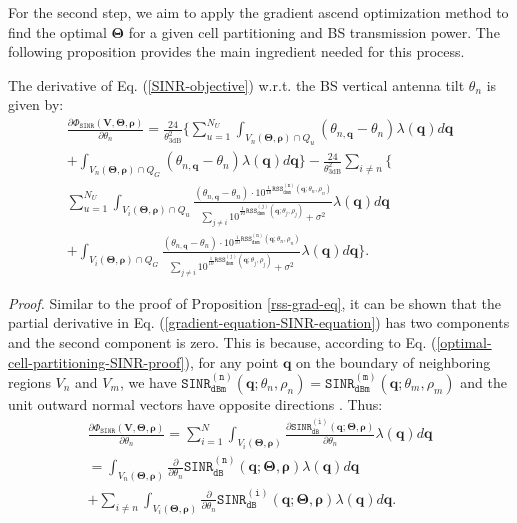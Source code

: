 For the second step, we aim to apply the gradient ascend optimization method to find the optimal $\bm{\Theta}$ for a given cell partitioning and BS transmission power. The following proposition provides the main ingredient needed for this process.
\begin{Proposition}\label{gradient-equation-SINR}
The derivative of Eq. (\ref{SINR-objective}) w.r.t. the BS vertical antenna tilt $\theta_n$ is given by:
\begin{multline}\label{gradient-equation-SINR-equation}
     \frac{\partial \Phi_{\mathtt{SINR}}(\bm{V}, \bm{\Theta}, \bm{\rho})}{\partial \theta_n} =  \frac{24}{\theta^2_{\mathrm{3dB}}} \Bigg\{ \sum_{u=1}^{N_U} \int_{V_n(\mathbf{\Theta}, \bm{\rho})\cap Q_u} \!\!\!\!\!\!\!\!\!\!\!\! (\theta_{n,\bm{q}}-\theta_n) \lambda(\bm{q}) d\bm{q}  
    \\ +  \int_{V_n(\mathbf{\Theta}, \bm{\rho})\cap Q_G} \!\!\!\! (\theta_{n,\bm{q}}-\theta_n) \lambda(\bm{q}) d\bm{q} \Bigg\}  -\frac{24}{\theta^2_{\mathrm{3dB}}} \sum_{i\neq n}^{}  \Bigg\{ \\ \sum_{u=1}^{N_U} \int_{V_i(\mathbf{\Theta}, \bm{\rho})\cap Q_u}  \frac{(\theta_{n,\bm{q}}-\theta_n) \cdot 10^{\frac{1}{10}\mathtt{RSS_{dBm}^{(n)}} (\bm{q}; \theta_n, \rho_n)}}{{\sum_{j\neq i}^{} 10^{\frac{1}{10}\mathtt{RSS_{dBm}^{(j)}} (\bm{q}; \theta_j, \rho_j)} + \sigma^2}} \lambda(\bm{q}) d\bm{q} 
    \\+ \int_{V_i(\mathbf{\Theta}, \bm{\rho})\cap Q_G}  \frac{(\theta_{n,\bm{q}}-\theta_n) \cdot 10^{\frac{1}{10}\mathtt{RSS_{dBm}^{(n)}} (\bm{q}; \theta_n, \rho_n)}}{{\sum_{j\neq i}^{} 10^{\frac{1}{10}\mathtt{RSS_{dBm}^{(j)}} (\bm{q}; \theta_j,\rho_j)} + \sigma^2}} \lambda(\bm{q}) d\bm{q} \Bigg\}.
\end{multline}
\end{Proposition}
\textit{Proof. }Similar to the proof of Proposition \ref{rss-grad-eq}, it can be shown that the partial derivative in Eq. (\ref{gradient-equation-SINR-equation}) has two components and the second component is zero. This is because, according to Eq. (\ref{optimal-cell-partitioning-SINR-proof}), for any point $\bm{q}$ on the boundary of neighboring regions $V_n$ and $V_m$, we have $\mathtt{SINR_{dBm}^{(n)}}(\bm{q}; \theta_n, \rho_n) = \mathtt{SINR_{dBm}^{(m)}}(\bm{q}; \theta_m, \rho_m)$ and the unit outward normal vectors have opposite directions \cite{GuoJaf2016}. Thus:
\begin{multline}\label{eqn:derivativePhi-SINR}
    \frac{\partial \Phi_{\mathtt{SINR}}(\bm{V},\mathbf{\Theta}, \bm{\rho})}{\partial \theta_n} = 
    \sum_{i=1}^{N} \int_{V_i(\mathbf{\Theta}, \bm{\rho})} \!\!\!\frac{\partial \mathtt{SINR_{dB}^{(i)}} (\bm{q}; \mathbf{\Theta}, \bm{\rho})}{\partial \theta_n}  \lambda(\bm{q})d\bm{q} \\
     =
    \int_{V_n(\mathbf{\Theta}, \bm{\rho})} \frac{\partial}{\partial \theta_n} \mathtt{SINR_{dB}^{(n)}} (\bm{q}; \mathbf{\Theta}, \bm{\rho}) \lambda(\bm{q})d\bm{q} 
      \\ + \sum_{i\neq n}^{} \int_{V_i(\mathbf{\Theta}, \bm{\rho})} \frac{\partial}{\partial \theta_n} \mathtt{SINR_{dB}^{(i)}} (\bm{q}; \mathbf{\Theta}, \bm{\rho}) \lambda(\bm{q})d\bm{q}.
\end{multline}
